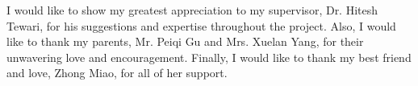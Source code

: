 \documentclass[a4paper, 12pt, oneside]{report}         %
\begin{document}

\thesistitlepage                                  %

\thesisdeclarationpage    			  %

\thesispermissionpage				  %


\begin{thesisacknowledgments}                     %
I would like to show my greatest appreciation to my supervisor, Dr. Hitesh Tewari, for his suggestions and expertise throughout the project. Also, I would like to thank my parents, Mr. Peiqi Gu and Mrs. Xuelan Yang, for their unwavering love and encouragement. Finally, I would like to thank my best friend and love, Zhong Miao, for all of her support.

\end{thesisacknowledgments}                       %
\end{document}
